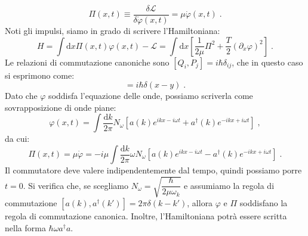 \documentclass[10pt,a4paper]{report}
\theoremstyle{definition}
\newcommand{\lag}{\mathcal{L}}
\numberwithin{equation}{section}
\newcommand{\diff}[1][]{\mathrm{d}#1}
\newcommand{\adj}[1]{#1^{\dagger}}
\begin{document}
\begin{equation}
\Pi(x,t)\equiv \frac{\delta\lag}{\delta\dot{\varphi}(x,t)}=\mu\dot{\varphi}(x,t)\;.
\end{equation}
Noti gli impulsi, siamo in grado di scrivere l'Hamiltoniana:
\begin{equation}
H=\int\diff{x}\Pi(x,t)\varphi(x,t)-\lag=\int\diff{x}\left[\frac{1}{2\mu}\Pi^2+\frac{T}{2}(\partial_x\varphi)^2\right]\;.
\end{equation}
Le relazioni di commutazione canoniche sono $[Q_i,P_j]=i\hbar\delta_{ij}$, che in questo caso si esprimono come:
\begin{equation}
[\varphi(x,t),\Pi(x,t)]=i\hbar\delta(x-y)\;.
\end{equation}
Dato che $\varphi$ soddisfa l'equazione delle onde, possiamo scriverla come sovrapposizione di onde piane:
\begin{equation}
\varphi(x,t)=\int\frac{\diff{k}}{2\pi}N_{\omega}\left[a(k)e^{ikx-i\omega t}+\adj{a}(k)e^{-ikx+i\omega t}\right]\;,
\end{equation}
da cui:
\begin{equation}
\Pi(x,t)=\mu\dot{\varphi}=-i\mu\int\frac{\diff{k}}{2\pi}\omega N_{\omega}\left[a(k)e^{ikx-i\omega t}-\adj{a}(k)e^{-ikx+i\omega t}\right]\;.
\end{equation}
Il commutatore deve valere indipendentemente dal tempo, quindi possiamo porre $t=0$. Si verifica che, se scegliamo $N_{\omega}=\sqrt{\dfrac{\hbar}{2\mu\omega_k}}$ e assumiamo la regola di commutazione $[a(k),\adj{a}(k')]=2\pi\delta(k-k')$, allora $\varphi$ e $\Pi$ soddisfano la regola di commutazione canonica. Inoltre, l'Hamiltoniana potrà essere scritta nella forma $\hbar\omega\adj{a}a$.
\end{document}
